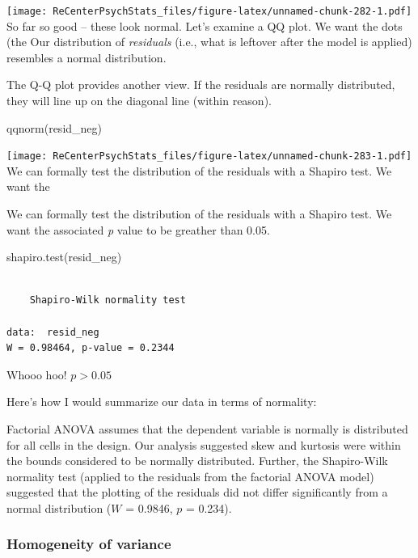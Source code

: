 \documentclass[
  11pt,
]{book}
\newenvironment{Shaded}{\begin{snugshade}}{\end{snugshade}}
\newcommand{\FunctionTok}[1]{\textcolor[rgb]{0.00,0.00,0.00}{#1}}
\newcommand{\NormalTok}[1]{#1}
\begin{document}
\texttt{[image: ReCenterPsychStats\_files/figure-latex/unnamed-chunk-282-1.pdf]}
So far so good -- these look normal. Let's examine a QQ plot. We want the dots (the
Our distribution of \emph{residuals} (i.e., what is leftover after the model is applied) resembles a normal distribution.

The Q-Q plot provides another view. If the residuals are normally distributed, they will line up on the diagonal line (within reason).

\begin{Shaded}
\begin{Highlighting}[]
\FunctionTok{qqnorm}\NormalTok{(resid\_neg)}
\end{Highlighting}
\end{Shaded}

\texttt{[image: ReCenterPsychStats\_files/figure-latex/unnamed-chunk-283-1.pdf]}
We can formally test the distribution of the residuals with a Shapiro test. We want the

We can formally test the distribution of the residuals with a Shapiro test. We want the associated \emph{p} value to be greather than 0.05.

\begin{Shaded}
\begin{Highlighting}[]
\FunctionTok{shapiro.test}\NormalTok{(resid\_neg)}
\end{Highlighting}
\end{Shaded}

\begin{verbatim}

    Shapiro-Wilk normality test

data:  resid_neg
W = 0.98464, p-value = 0.2344
\end{verbatim}

Whooo hoo! \(p > 0.05\)

Here's how I would summarize our data in terms of normality:

Factorial ANOVA assumes that the dependent variable is normally is distributed for all cells in the design. Our analysis suggested skew and kurtosis were within the bounds considered to be normally distributed. Further, the Shapiro-Wilk normality test (applied to the residuals from the factorial ANOVA model) suggested that the plotting of the residuals did not differ significantly from a normal distribution (\(W\) = 0.9846, \(p\) = 0.234).

\hypertarget{homogeneity-of-variance}{%
\subsubsection{Homogeneity of variance}\label{homogeneity-of-variance}}
\end{document}
